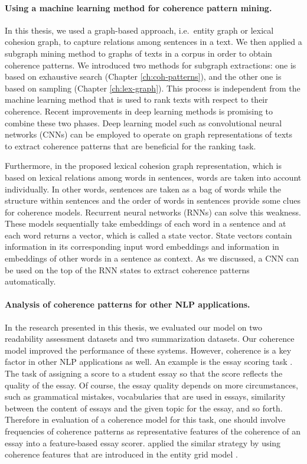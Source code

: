 \paragraph{Using a machine learning method for coherence pattern mining.} 
In this thesis, we used a graph-based approach, i.e.\ entity graph or lexical cohesion graph, to capture relations among sentences in a text. 
We then applied a subgraph mining method to graphs of texts in a corpus in order to obtain coherence patterns. 
We introduced two methods for subgraph extractions: one is based on exhaustive search (Chapter \ref{ch:coh-patterns}), and the other one is based on sampling (Chapter \ref{ch:lex-graph}). 
This process is independent from the machine learning method that is used to rank texts with respect to their coherence. 
Recent improvements in deep learning methods is promising to combine these two phases. 
Deep learning model such as convolutional neural networks (CNNs) \cite{kimyoon14} can be employed to operate on graph representations of texts to extract coherence patterns that are beneficial for the ranking task. 

Furthermore, in the proposed lexical cohesion graph representation, which is based on lexical relations among words in sentences, words are taken into account individually. 
In other words, sentences are taken as a bag of words while the structure within sentences \cite{louis12} and the order of words in sentences provide some clues for coherence models. 
Recurrent neural networks (RNNs) can solve this weakness. 
These models sequentially take embeddings of each word in a sentence and at each word returns a vector, which is called a state vector.  
State vectors contain information in its corresponding input word embeddings and information in embeddings of other words in a sentence as context.  
As we discussed, a CNN can be used on the top of the RNN states to extract coherence patterns automatically. 

\paragraph{Analysis of coherence patterns for other NLP applications.}
In the research presented in this thesis, we evaluated our model on two readability assessment datasets and two summarization datasets. 
Our coherence model improved the performance of these systems. 
However, coherence is a key factor in other NLP applications as well. 
An example is the essay scoring task \cite{dikli06,higgins04,miltsakaki04a,}.  
The task of assigning a score to a student essay so that the score reflects the quality of the essay. 
Of course, the essay quality depends on more circumstances, such as grammatical mistakes, vocabularies that are used in essays, similarity between the content of essays and the given topic for the essay, and so forth. 
Therefore in evaluation of a coherence model for this task, one should involve frequencies of coherence patterns as representative features of the coherence of an essay into a feature-based essay scorer. 
 applied the similar strategy by using coherence features that are introduced in the entity grid model \cite{barzilay05a}. 

